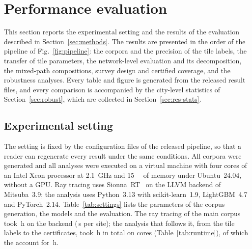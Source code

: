 \section{Performance evaluation}
\label{sec:results}

This section reports the experimental setting and the results of the
evaluation described in Section~\ref{sec:methods}. The results are
presented in the order of the pipeline of Fig.~\ref{fig:pipeline}: the
corpora and the precision of the tile labels, the transfer of tile
parameters, the network-level evaluation and its decomposition, the
mixed-path compositions, survey design and certified coverage, and the
robustness analyses. Every table and figure is generated from the released
result files, and every comparison is accompanied by the city-level
statistics of Section~\ref{sec:robust}, which are collected in
Section~\ref{sec:res-stats}.

\subsection{Experimental setting}
\label{sec:setting}

The setting is fixed by the configuration files of the released pipeline,
so that a reader can regenerate every result under the same conditions.
All corpora were generated and all analyses were executed on a virtual
machine with four cores of an Intel Xeon processor at
\SI{2.1}{\giga\hertz} and \SI{15}{\giga\byte} of memory under Ubuntu~24.04,
without a GPU. Ray tracing uses Sionna~RT~\sionnaVersion{} on the LLVM
backend of Mitsuba~3.9; the analysis uses Python~3.13 with
scikit-learn~1.9, LightGBM~4.7 and PyTorch~2.14. Table~\ref{tab:settings}
lists the parameters of the corpus generation, the models and the
evaluation. The ray tracing of the main corpus took \rtHours{}\,h on the
\rtBackend{} backend (\rtSecPerSite{}\,s per site); the analysis that
follows it, from the tile labels to the certificates, took
\rtTotalHours{}\,h in total on \rtCpus{} cores (Table~\ref{tab:runtime}),
of which the \rtHeaviestStage{} account for \rtHeaviestHours{}\,h.

